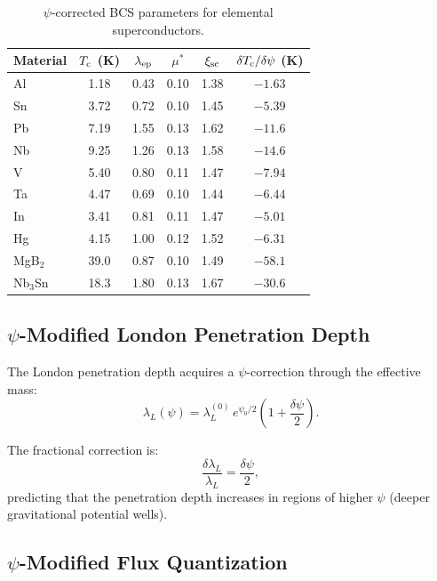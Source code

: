 \documentclass[aps,prb,twocolumn,superscriptaddress,floatfix,nofootinbib,longbibliography]{revtex4-2}
\newcommand{\Tc}{T_{\rm c}}
\begin{document}
\begin{table}[h]
\caption{$\psi$-corrected BCS parameters for elemental superconductors.}
\label{tab:bcs-psi}
\begin{ruledtabular}
\begin{tabular}{lccccc}
Material & $\Tc$ (K) & $\lambda_{\rm ep}$ & $\mu^*$ & $\xi_{\rm sc}$ &
$\delta\Tc/\delta\psi$ (K) \\
\hline
Al & 1.18 & 0.43 & 0.10 & 1.38 & $-1.63$ \\
Sn & 3.72 & 0.72 & 0.10 & 1.45 & $-5.39$ \\
Pb & 7.19 & 1.55 & 0.13 & 1.62 & $-11.6$ \\
Nb & 9.25 & 1.26 & 0.13 & 1.58 & $-14.6$ \\
V & 5.40 & 0.80 & 0.11 & 1.47 & $-7.94$ \\
Ta & 4.47 & 0.69 & 0.10 & 1.44 & $-6.44$ \\
In & 3.41 & 0.81 & 0.11 & 1.47 & $-5.01$ \\
Hg & 4.15 & 1.00 & 0.12 & 1.52 & $-6.31$ \\
MgB$_2$ & 39.0 & 0.87 & 0.10 & 1.49 & $-58.1$ \\
Nb$_3$Sn & 18.3 & 1.80 & 0.13 & 1.67 & $-30.6$ \\
\end{tabular}
\end{ruledtabular}
\end{table}

\subsection{$\psi$-Modified London Penetration Depth}

The London penetration depth acquires a $\psi$-correction through the
effective mass:
\begin{equation}
\lambda_L(\psi) = \lambda_L^{(0)}\,e^{\psi_0/2}
\left(1 + \frac{\delta\psi}{2}\right).
\label{eq:london-psi}
\end{equation}

The fractional correction is:
\begin{equation}
\frac{\delta\lambda_L}{\lambda_L} = \frac{\delta\psi}{2},
\label{eq:london-shift}
\end{equation}
predicting that the penetration depth increases in regions of higher
$\psi$ (deeper gravitational potential wells).

\subsection{$\psi$-Modified Flux Quantization}
\end{document}

